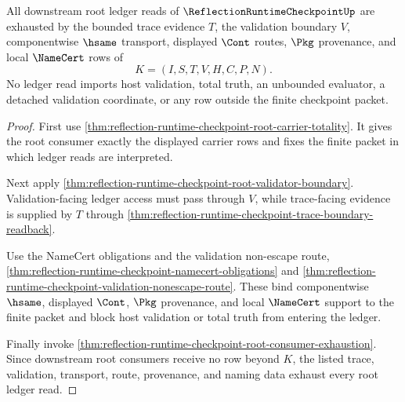 \begin{theorem}
\label{thm:reflection-runtime-checkpoint-root-ledger-exactness}
All downstream root ledger reads of $\ReflectionRuntimeCheckpointUp$ are exhausted by the bounded trace evidence $T$, the validation boundary $V$, componentwise $\hsame$ transport, displayed $\Cont$ routes, $\Pkg$ provenance, and local $\NameCert$ rows of
$$
K=(I,S,T,V,H,C,P,N).
$$
No ledger read imports host validation, total truth, an unbounded evaluator, a detached validation coordinate, or any row outside the finite checkpoint packet.
\end{theorem}
\begin{proof}
First use \autoref{thm:reflection-runtime-checkpoint-root-carrier-totality}. It gives the root consumer exactly the displayed carrier rows and fixes the finite packet in which ledger reads are interpreted.

Next apply \autoref{thm:reflection-runtime-checkpoint-root-validator-boundary}. Validation-facing ledger access must pass through $V$, while trace-facing evidence is supplied by $T$ through \autoref{thm:reflection-runtime-checkpoint-trace-boundary-readback}.

Use the NameCert obligations and the validation non-escape route, \autoref{thm:reflection-runtime-checkpoint-namecert-obligations} and \autoref{thm:reflection-runtime-checkpoint-validation-nonescape-route}. These bind componentwise $\hsame$, displayed $\Cont$, $\Pkg$ provenance, and local $\NameCert$ support to the finite packet and block host validation or total truth from entering the ledger.

Finally invoke \autoref{thm:reflection-runtime-checkpoint-root-consumer-exhaustion}. Since downstream root consumers receive no row beyond $K$, the listed trace, validation, transport, route, provenance, and naming data exhaust every root ledger read.
\end{proof}

